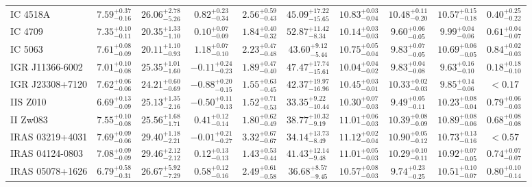 \documentclass[onecolumn]{mn2e}
\begin{document}
\begin{landscape}
{\begin{center}
\begin{longtable}{lccccccccc}
IC 4518A & $7.59_{-0.16}^{+0.37}$ & $26.06_{-5.26}^{+2.78}$ & $0.82_{-0.34}^{+0.23}$ & $2.56_{-0.43}^{+0.59}$ &$45.09_{-15.65}^{+17.22}$ & $10.83_{-0.04}^{+0.03}$ & $10.48_{-0.20}^{+0.11}$ & $10.57_{-0.18}^{+0.15}$ & $0.40_{-0.22}^{+0.25}$ \\
IC 4709 & $7.35_{-0.11}^{+0.10}$ & $20.35_{-1.10}^{+1.33}$ & $0.10_{-0.09}^{+0.07}$ & $1.84_{-0.32}^{+0.40}$ &$52.87_{-8.34}^{+11.42}$ & $10.14_{-0.03}^{+0.03}$ & $9.60_{-0.05}^{+0.06}$ & $9.99_{-0.06}^{+0.04}$ & $0.61_{-0.07}^{+0.04}$ \\
IC 5063 & $7.61_{-0.09}^{+0.08}$ & $20.11_{-0.93}^{+1.10}$ & $1.18_{-0.10}^{+0.07}$ & $2.23_{-0.48}^{+0.47}$ &$43.60_{-5.44}^{+9.12}$ & $10.75_{-0.04}^{+0.05}$ & $9.83_{-0.05}^{+0.07}$ & $10.69_{-0.05}^{+0.06}$ & $0.84_{-0.03}^{+0.02}$ \\
IGR J11366-6002 & $7.01_{-0.08}^{+0.10}$ & $25.35_{-1.60}^{+1.01}$ & $-0.11_{-0.23}^{+0.24}$ & $1.89_{-0.40}^{+0.47}$ &$47.47_{-15.61}^{+17.74}$ & $10.04_{-0.02}^{+0.04}$ & $9.83_{-0.08}^{+0.04}$ & $9.63_{-0.10}^{+0.16}$ & $0.18_{-0.10}^{+0.18}$ \\
IGR J23308+7120 & $7.62_{-0.06}^{+0.06}$ & $24.21_{-0.69}^{+0.60}$ & $-0.88_{-0.15}^{+0.20}$ & $1.55_{-0.45}^{+0.63}$ &$42.37_{-16.96}^{+19.97}$ & $10.45_{-0.01}^{+0.03}$ & $10.33_{-0.03}^{+0.02}$ & $9.85_{-0.06}^{+0.14}$ & $<0.17$ \\
IIS Z010 & $6.69_{-0.09}^{+0.13}$ & $25.13_{-2.16}^{+1.35}$ & $-0.50_{-0.13}^{+0.11}$ & $1.52_{-0.53}^{+0.71}$ &$33.35_{-10.44}^{+9.22}$ & $10.30_{-0.03}^{+0.07}$ & $9.49_{-0.11}^{+0.05}$ & $10.23_{-0.04}^{+0.08}$ & $0.79_{-0.03}^{+0.06}$ \\
II Zw083 & $7.55_{-0.08}^{+0.10}$ & $25.56_{-1.71}^{+1.68}$ & $0.41_{-0.14}^{+0.12}$ & $1.80_{-0.49}^{+0.62}$ &$38.77_{-9.19}^{+10.32}$ & $11.01_{-0.03}^{+0.06}$ & $10.39_{-0.09}^{+0.08}$ & $10.89_{-0.06}^{+0.08}$ & $0.68_{-0.08}^{+0.08}$ \\
IRAS 03219+4031 & $7.69_{-0.06}^{+0.09}$ & $29.40_{-2.21}^{+1.18}$ & $-0.01_{-0.27}^{+0.21}$ & $3.32_{-0.67}^{+0.67}$ &$34.14_{-8.49}^{+13.73}$ & $11.12_{-0.04}^{+0.02}$ & $10.90_{-0.12}^{+0.05}$ & $10.73_{-0.16}^{+0.13}$ & $<0.57$ \\
IRAS 04124-0803 & $7.08_{-0.09}^{+0.09}$ & $29.46_{-2.12}^{+2.12}$ & $0.12_{-0.13}^{+0.13}$ & $1.43_{-0.44}^{+0.53}$ &$41.43_{-9.48}^{+12.14}$ & $11.01_{-0.03}^{+0.05}$ & $10.29_{-0.11}^{+0.10}$ & $10.92_{-0.05}^{+0.07}$ & $0.74_{-0.07}^{+0.07}$ \\
IRAS 05078+1626 & $6.79_{-0.31}^{+0.58}$ & $26.67_{-7.29}^{+5.92}$ & $0.58_{-0.16}^{+0.12}$ & $2.49_{-0.58}^{+0.61}$ &$36.68_{-9.45}^{+8.57}$ & $10.57_{-0.03}^{+0.08}$ & $9.74_{-0.25}^{+0.23}$ & $10.51_{-0.07}^{+0.10}$ & $0.80_{-0.14}^{+0.10}$ \\

\end{longtable}
\end{center}}
\end{landscape}
\end{document}
